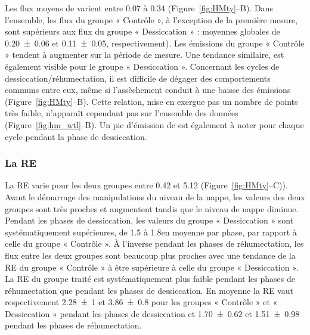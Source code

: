 Les flux moyens de \chh varient entre \num{0.07} à \SI{0.34}{\uml} (Figure~\ref{fig:HMty}--B).
Dans l'ensemble, les flux du groupe « Contrôle », à l'exception de la première mesure, sont supérieurs aux flux du groupe « Dessiccation » : moyennes globales de \num{0.20(006)} et \SI{0.11(005)}{\uml}, respectivement).
Les émissions du groupe « Contrôle » tendent à augmenter sur la période de mesure.
Une tendance similaire, est également visible pour le groupe « Dessiccation ».
Concernant les cycles de dessiccation/réhumectation, il est difficile de dégager des comportements communs entre eux, même si l'assèchement conduit à une baisse des émissions (Figure~\ref{fig:HMty}--B).
Cette relation, mise en exergue pas un nombre de points très faible, n’apparaît cependant pas sur l'ensemble des données (Figure~\ref{fig:hm_wtl}--B).
Un pic d'émission de \chh est également à noter pour chaque cycle pendant la phase de dessiccation.

\subsubsection{La RE}

La RE varie pour les deux groupes entre \num{0.42} et \SI{5.12}{\uml} (Figure~\ref{fig:HMty}--C)).
Avant le démarrage des manipulations du niveau de la nappe, les valeurs des deux groupes sont très proches et augmentent tandis que le niveau de nappe diminue.
Pendant les phases de dessiccation, les valeurs du groupe « Dessiccation » sont systématiquement supérieures, de \num{1.5} à \SI{1.8}{\uml}en moyenne par phase, par rapport à celle du groupe « Contrôle ».
À l'inverse pendant les phases de réhumectation, les flux entre les deux groupes sont beaucoup plus proches avec une tendance de la RE du groupe « Contrôle » à être supérieure à celle du groupe « Dessiccation ».
La RE du groupe traité est systématiquement plus faible pendant les phases de réhumectation que pendant les phases de dessiccation.
En moyenne la RE vaut respectivement \num{2.28(100)} et \SI{3.86(080)}{\uml} pour les groupes « Contrôle » et « Dessiccation » pendant les phases de dessiccation et \num{1.70(062)} et \SI{1.51(098)}{\uml} pendant les phases de réhumectation.
